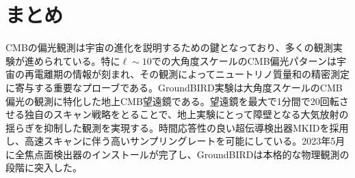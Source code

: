 \chapter{まとめ}
\label{chapter6}

CMBの偏光観測は宇宙の進化を説明するための鍵となっており、多くの観測実験が進められている。特に$\ell\sim 10$での大角度スケールのCMB偏光パターンは宇宙の再電離期の情報が刻まれ、その観測によってニュートリノ質量和の精密測定に寄与する重要なプローブである。GroundBIRD実験は大角度スケールのCMB偏光の観測に特化した地上CMB望遠鏡である。望遠鏡を最大で1分間で20回転させる独自のスキャン戦略をとることで、地上実験にとって障壁となる大気放射の揺らぎを抑制した観測を実現する。時間応答性の良い超伝導検出器MKIDを採用し、高速スキャンに伴う高いサンプリングレートを可能にしている。2023年5月に全焦点面検出器のインストールが完了し、GroundBIRDは本格的な物理観測の段階に突入した。
